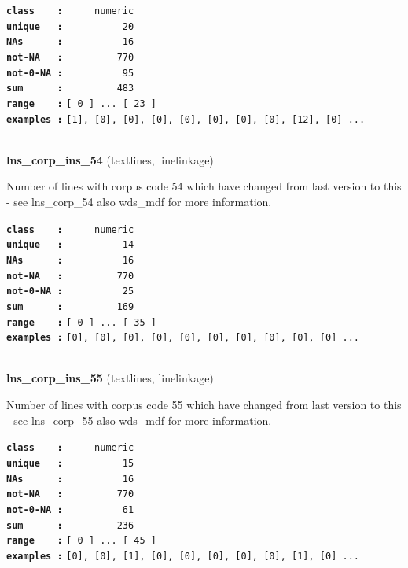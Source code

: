 \documentclass[]{article}
\begin{document}
\textbf{\texttt{class\ \ \ \ :}} \texttt{~~~~~numeric}\\
\textbf{\texttt{unique\ \ \ :}} \texttt{~~~~~~~~~~20}\\
\textbf{\texttt{NAs\ \ \ \ \ \ :}} \texttt{~~~~~~~~~~16}\\
\textbf{\texttt{not-NA\ \ \ :}} \texttt{~~~~~~~~~770}\\
\textbf{\texttt{not-0-NA\ :}} \texttt{~~~~~~~~~~95}\\
\textbf{\texttt{sum\ \ \ \ \ \ :}} \texttt{~~~~~~~~~483}\\
\textbf{\texttt{range\ \ \ \ :}}
\texttt{{[}\ 0\ {]}\ ...\ {[}\ 23\ {]}}\\
\textbf{\texttt{examples\ :}}
\texttt{{[}1{]},\ {[}0{]},\ {[}0{]},\ {[}0{]},\ {[}0{]},\ {[}0{]},\ {[}0{]},\ {[}0{]},\ {[}12{]},\ {[}0{]}\ ...}\\

~

\textbf{lns\_corp\_ins\_54} (textlines, linelinkage)

Number of lines with corpus code 54 which have changed from last version
to this - see lns\_corp\_54 also wds\_mdf for more information.

\textbf{\texttt{class\ \ \ \ :}} \texttt{~~~~~numeric}\\
\textbf{\texttt{unique\ \ \ :}} \texttt{~~~~~~~~~~14}\\
\textbf{\texttt{NAs\ \ \ \ \ \ :}} \texttt{~~~~~~~~~~16}\\
\textbf{\texttt{not-NA\ \ \ :}} \texttt{~~~~~~~~~770}\\
\textbf{\texttt{not-0-NA\ :}} \texttt{~~~~~~~~~~25}\\
\textbf{\texttt{sum\ \ \ \ \ \ :}} \texttt{~~~~~~~~~169}\\
\textbf{\texttt{range\ \ \ \ :}}
\texttt{{[}\ 0\ {]}\ ...\ {[}\ 35\ {]}}\\
\textbf{\texttt{examples\ :}}
\texttt{{[}0{]},\ {[}0{]},\ {[}0{]},\ {[}0{]},\ {[}0{]},\ {[}0{]},\ {[}0{]},\ {[}0{]},\ {[}0{]},\ {[}0{]}\ ...}\\

~

\textbf{lns\_corp\_ins\_55} (textlines, linelinkage)

Number of lines with corpus code 55 which have changed from last version
to this - see lns\_corp\_55 also wds\_mdf for more information.

\textbf{\texttt{class\ \ \ \ :}} \texttt{~~~~~numeric}\\
\textbf{\texttt{unique\ \ \ :}} \texttt{~~~~~~~~~~15}\\
\textbf{\texttt{NAs\ \ \ \ \ \ :}} \texttt{~~~~~~~~~~16}\\
\textbf{\texttt{not-NA\ \ \ :}} \texttt{~~~~~~~~~770}\\
\textbf{\texttt{not-0-NA\ :}} \texttt{~~~~~~~~~~61}\\
\textbf{\texttt{sum\ \ \ \ \ \ :}} \texttt{~~~~~~~~~236}\\
\textbf{\texttt{range\ \ \ \ :}}
\texttt{{[}\ 0\ {]}\ ...\ {[}\ 45\ {]}}\\
\textbf{\texttt{examples\ :}}
\texttt{{[}0{]},\ {[}0{]},\ {[}1{]},\ {[}0{]},\ {[}0{]},\ {[}0{]},\ {[}0{]},\ {[}0{]},\ {[}1{]},\ {[}0{]}\ ...}\\
\end{document}
